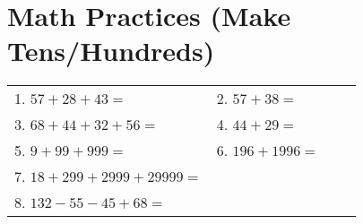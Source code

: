 \documentclass[a4paper,12pt]{article}
\begin{document}
\newpage
\section*{\huge \center\textbf{Math Practices (Make Tens/Hundreds)}}
\vspace{1 cm}
\renewcommand{\arraystretch}{2} %
\setlength{\extrarowheight}{5pt} %

\noindent
\begin{tabularx}{\textwidth}{lX lX}
    \vspace{3cm}
    1. \textbf{\Large $57 + 28 + 43 =$} \underline{\hspace{2cm}} \hspace{1.1cm} & 2. \textbf{\Large $57 + 38 =$} \underline{\hspace{2cm}} \\ 
    \vspace{3cm}
    3. \textbf{\Large $68 + 44 + 32 + 56 =$} \underline{\hspace{2cm}} & 4. \textbf{\Large $44 + 29 =$} \underline{\hspace{2cm}} \\
    \vspace{4cm}
    5. \textbf{\Large $9 + 99 + 999 =$} \underline{\hspace{2cm}} & 6. \textbf{\Large $196 + 1996 =$} \underline{\hspace{2cm}} \\
    \vspace{4cm}
    7. \textbf{\Large $18 + 299 + 2999 + 29999 =$} \underline{\hspace{2cm}} & \\
    8. \textbf{\Large $132 - 55 - 45 + 68 =$} \underline{\hspace{2cm}} \\
\end{tabularx}
\end{document}
